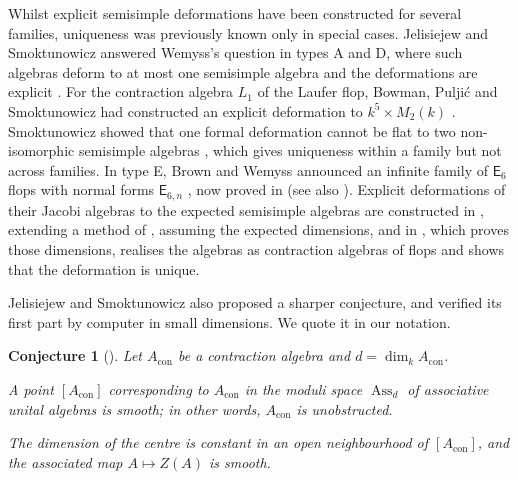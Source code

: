 \documentclass[11pt]{amsart}
\makeatletter
\numberwithin{table}{section}
\numberwithin{figure}{section}
\numberwithin{equation}{section}
\theoremstyle{definition}
\theoremstyle{plain}
\newtheorem*{conjJS}{Conjecture}
\newcommand{\Acon}{A_{\mathrm{con}}}
\DeclareMathOperator{\Ass}{Ass}
\renewcommand\paragraph{\@startsection{paragraph}{4}{\z@}{\medskipamount}{-.5em}{\normalfont\bfseries}}
\makeatother
\begin{document}
\paragraph{Previous work.} Whilst explicit semisimple deformations have been constructed for several families, uniqueness was previously known only in special cases. Jelisiejew and Smoktunowicz answered Wemyss's question in types A and D, where such algebras deform to at most one semisimple algebra and the deformations are explicit \cite[\S3, Thm~3.7]{JS}. For the contraction algebra $L_1$ of the Laufer flop, Bowman, Pulji\'c and Smoktunowicz had constructed an explicit deformation to $k^5 \times M_2(k)$ \cite[Thm~4.2]{BPS}. Smoktunowicz showed that one formal deformation cannot be flat to two non-isomorphic semisimple algebras \cite[Thm~2]{Smo2}, which gives uniqueness within a family but not across families. In type E, Brown and Wemyss announced an infinite family of $\mathsf{E}_6$ flops with normal forms $\mathsf{E}_{6,n}$ \cite[\S1.5, Table~1]{BW}, now proved in \cite[Thms~1.2, 1.3]{BW26} (see also \cite{Wem}). Explicit deformations of their Jacobi algebras to the expected semisimple algebras are constructed in \cite{SS}, extending a method of \cite[\S11]{Smo1}, assuming the expected dimensions, and in \cite{Pan}, which proves those dimensions, realises the algebras as contraction algebras of flops and shows that the deformation is unique.

Jelisiejew and Smoktunowicz also proposed a sharper conjecture, and verified its first part by computer in small dimensions. We quote it in our notation.

\begin{conjJS}[{\cite[Conj~1.4]{JS}}]
Let $\Acon$ be a contraction algebra and $d = \dim_k \Acon$.
\begin{thmlist}
\item A point $[\Acon]$ corresponding to $\Acon$ in the moduli space $\Ass_d$ of associative unital algebras is smooth; in other words, $\Acon$ is unobstructed.
\item The dimension of the centre is constant in an open neighbourhood of $[\Acon]$, and the associated map $A \mapsto Z(A)$ is smooth.
\end{thmlist}
\end{conjJS}
\end{document}
